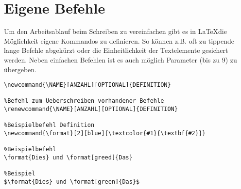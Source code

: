 \chapter{Eigene Befehle}
Um den Arbeitsablauf beim Schreiben zu vereinfachen gibt es in \LaTeX die Möglichkeit eigene Kommandos zu definieren. So können z.B. oft zu tippende lange Befehle abgekürzt oder die Einheitlichkeit der Textelemente gesichert werden. Neben einfachen Befehlen ist es auch möglich Parameter (bis zu 9) zu übergeben.
\begin{lstlisting}[caption={Befehl mit Parametern}, escapechar=$]
%Befehl
\newcommand{\NAME}[ANZAHL][OPTIONAL]{DEFINITION}

%Befehl zum Ueberschreiben vorhandener Befehle
\renewcommand{\NAME}[ANZAHL][OPTIONAL]{DEFINITION}

%Beispielbefehl Definition
\newcommand{\format}[2][blue]{\textcolor{#1}{\textbf{#2}}}

%Beispielbefehl
\format{Dies} und \format[greed]{Das}

%Beispiel
$\format{Dies} und \format[green]{Das}$
\end{lstlisting}
